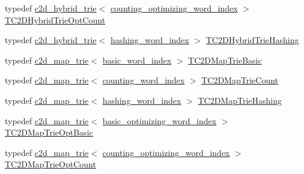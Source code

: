 \begin{DoxyCompactItemize}
\item 
typedef \hyperlink{classuva_1_1smt_1_1bpbd_1_1server_1_1lm_1_1c2d__hybrid__trie}{c2d\+\_\+hybrid\+\_\+trie}$<$ \hyperlink{namespaceuva_1_1smt_1_1bpbd_1_1server_1_1lm_1_1dictionary_a61cbd647b15de785ccf4cdd26661c366}{counting\+\_\+optimizing\+\_\+word\+\_\+index} $>$ \hyperlink{namespaceuva_1_1smt_1_1bpbd_1_1server_1_1lm_ad6272a176cac7528701a115cc68a485c}{T\+C2\+D\+Hybrid\+Trie\+Opt\+Count}
\item 
typedef \hyperlink{classuva_1_1smt_1_1bpbd_1_1server_1_1lm_1_1c2d__hybrid__trie}{c2d\+\_\+hybrid\+\_\+trie}$<$ \hyperlink{classuva_1_1smt_1_1bpbd_1_1server_1_1lm_1_1dictionary_1_1hashing__word__index}{hashing\+\_\+word\+\_\+index} $>$ \hyperlink{namespaceuva_1_1smt_1_1bpbd_1_1server_1_1lm_af93f666e7d0833493d6cb5993a58247d}{T\+C2\+D\+Hybrid\+Trie\+Hashing}
\item 
typedef \hyperlink{classuva_1_1smt_1_1bpbd_1_1server_1_1lm_1_1c2d__map__trie}{c2d\+\_\+map\+\_\+trie}$<$ \hyperlink{classuva_1_1smt_1_1bpbd_1_1server_1_1lm_1_1dictionary_1_1basic__word__index}{basic\+\_\+word\+\_\+index} $>$ \hyperlink{namespaceuva_1_1smt_1_1bpbd_1_1server_1_1lm_a75d788d13013f404f0c4527c0e737931}{T\+C2\+D\+Map\+Trie\+Basic}
\item 
typedef \hyperlink{classuva_1_1smt_1_1bpbd_1_1server_1_1lm_1_1c2d__map__trie}{c2d\+\_\+map\+\_\+trie}$<$ \hyperlink{classuva_1_1smt_1_1bpbd_1_1server_1_1lm_1_1dictionary_1_1counting__word__index}{counting\+\_\+word\+\_\+index} $>$ \hyperlink{namespaceuva_1_1smt_1_1bpbd_1_1server_1_1lm_ae3cabc935d941692c21b332a2c187907}{T\+C2\+D\+Map\+Trie\+Count}
\item 
typedef \hyperlink{classuva_1_1smt_1_1bpbd_1_1server_1_1lm_1_1c2d__map__trie}{c2d\+\_\+map\+\_\+trie}$<$ \hyperlink{classuva_1_1smt_1_1bpbd_1_1server_1_1lm_1_1dictionary_1_1hashing__word__index}{hashing\+\_\+word\+\_\+index} $>$ \hyperlink{namespaceuva_1_1smt_1_1bpbd_1_1server_1_1lm_a506e03c5deb4996143f74b16273abafb}{T\+C2\+D\+Map\+Trie\+Hashing}
\item 
typedef \hyperlink{classuva_1_1smt_1_1bpbd_1_1server_1_1lm_1_1c2d__map__trie}{c2d\+\_\+map\+\_\+trie}$<$ \hyperlink{namespaceuva_1_1smt_1_1bpbd_1_1server_1_1lm_1_1dictionary_a3001583c904eec702b4a4125082a7ecd}{basic\+\_\+optimizing\+\_\+word\+\_\+index} $>$ \hyperlink{namespaceuva_1_1smt_1_1bpbd_1_1server_1_1lm_a56b8b6129cd9937e0a578484667f3c24}{T\+C2\+D\+Map\+Trie\+Opt\+Basic}
\item 
typedef \hyperlink{classuva_1_1smt_1_1bpbd_1_1server_1_1lm_1_1c2d__map__trie}{c2d\+\_\+map\+\_\+trie}$<$ \hyperlink{namespaceuva_1_1smt_1_1bpbd_1_1server_1_1lm_1_1dictionary_a61cbd647b15de785ccf4cdd26661c366}{counting\+\_\+optimizing\+\_\+word\+\_\+index} $>$ \hyperlink{namespaceuva_1_1smt_1_1bpbd_1_1server_1_1lm_a30de341baef0836c7ebad764c9a043c1}{T\+C2\+D\+Map\+Trie\+Opt\+Count}

\end{DoxyCompactItemize}
